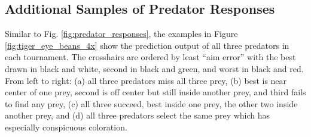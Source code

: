 \documentclass[letterpaper]{article}
\newcommand{\runID}{\footnotesize}
\newcommand{\igfour}[1]{\texttt{[image: \#1]}}
\begin{document}
\newpage



\subsection{Additional Samples of Predator Responses}
\label{sec:additional_predator_responses}
Similar to Fig. \ref{fig:predator_responses}, the examples in Figure \ref{fig:tiger_eye_beans_4x} show the prediction output of all three predators in each tournament. The crosshairs are ordered by least ``aim error'' with the best drawn in black and white, second in black and green, and worst in black and red. From left to right: (a) all three predators miss all three prey, (b) best is near center of one prey, second is off center but still inside another prey, and third fails to find any prey, (c) all three succeed, best inside one prey, the other two inside another prey, and (d) all three predators select the same prey which has especially conspicuous coloration.
\par

\end{document}
